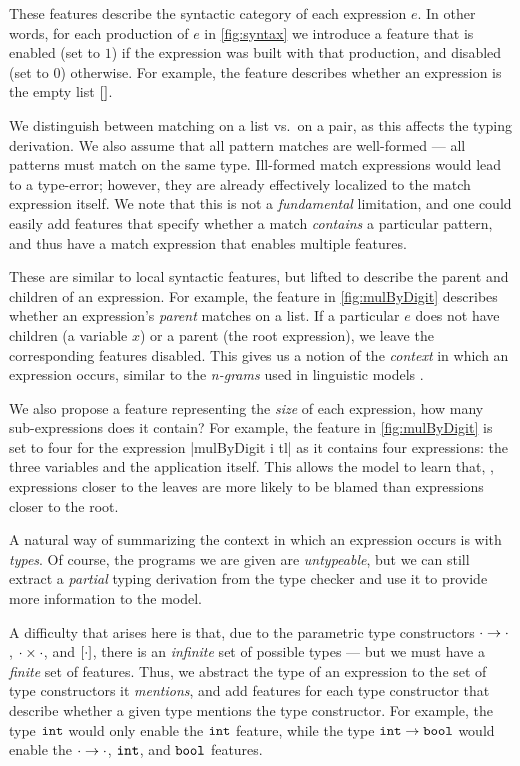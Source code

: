 These features describe the syntactic category of each expression $e$. In other
words, for each production of $e$ in \autoref{fig:syntax} we introduce a feature
that is enabled (set to $1$) if the expression was built with that production,
and disabled (set to $0$) otherwise. For example, the \IsNil feature describes
whether an expression is the empty list $\mathtt{[]}$.

We distinguish between matching on a list vs.\ on a pair, as this affects the
typing derivation. We also assume that all pattern matches are well-formed ---
\ie all patterns must match on the same type. Ill-formed match expressions would
lead to a type-error; however, they are already effectively localized to the
match expression itself. We note that this is not a \emph{fundamental}
limitation, and one could easily add features that specify whether a match
\emph{contains} a particular pattern, and thus have a match expression that
enables multiple features.

These are similar to local syntactic features, but lifted to describe the parent
and children of an expression. For example, the \IsCaseListP feature in
\autoref{fig:mulByDigit} describes whether an expression's \emph{parent} matches on
a list. If a particular $e$ does not have children (\eg a variable $x$) or a
parent (\ie the root expression), we leave the corresponding features disabled.
This gives us a notion of the \emph{context} in which an expression occurs,
similar to the \emph{n-grams} used in linguistic models
\citep{Hindle2012-hf,Gabel2010-el}.

We also propose a feature representing the \emph{size} of each expression, \ie
how many sub-expressions does it contain? For example, the \ExprSize feature in
\autoref{fig:mulByDigit} is set to four for the expression |mulByDigit i tl| as it
contains four expressions: the three variables and the application itself. This
allows the model to learn that, \eg, expressions closer to the leaves are more
likely to be blamed than expressions closer to the root.

A natural way of summarizing the context in which an expression occurs is with
\emph{types}. Of course, the programs we are given are \emph{untypeable}, but we
can still extract a \emph{partial} typing derivation from the type checker and
use it to provide more information to the model.

A difficulty that arises here is that, due to the parametric type constructors
$\cdot \to \cdot$, $\cdot \times \cdot$, and $[\cdot]$, there is an
\emph{infinite} set of possible types --- but we must have a \emph{finite} set
of features. Thus, we abstract the type of an expression to the set of type
constructors it \emph{mentions}, and add features for each type constructor that
describe whether a given type mentions the type constructor. For example, the
type $\mathtt{int}$ would only enable the $\mathtt{int}$ feature, while the type
$\mathtt{int} \to \mathtt{bool}$ would enable the $\cdot \to \cdot$, $\mathtt{int}$, and
$\mathtt{bool}$ features.

